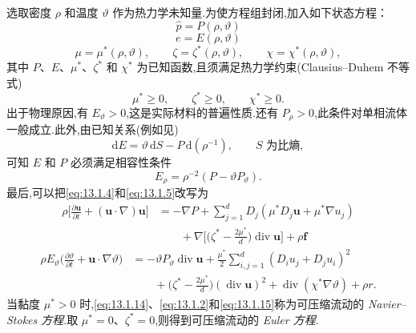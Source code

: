 选取密度 \(\rho\) 和温度 \(\vartheta\) 作为热力学未知量.为使方程组封闭,加入如下状态方程：
\begin{equation}\label{eq:13.1.8}
  \widehat p=P(\rho,\vartheta)
\end{equation}
\begin{equation}\label{eq:13.1.9}
  e=E(\rho,\vartheta)
\end{equation}
\begin{equation}\label{eq:13.1.10}
  \mu=\mu^*(\rho,\vartheta),\qquad
  \zeta=\zeta^*(\rho,\vartheta),\qquad
  \chi=\chi^*(\rho,\vartheta),
\end{equation}
其中 \(P\)、\(E\)、\(\mu^*\)、\(\zeta^*\) 和 \(\chi^*\) 为已知函数,且须满足热力学约束(Clausius--Duhem 不等式)
\begin{equation}\label{eq:13.1.11}
  \mu^*\ge0,\qquad\zeta^*\ge0,\qquad\chi^*\ge0.
\end{equation}
出于物理原因,有 \(E_\vartheta>0\),这是实际材料的普遍性质.还有 \(P_\rho>0\),此条件对单相流体一般成立.此外,由已知关系(例如见)
\begin{equation}\label{eq:13.1.12}
  \mathrm dE=\vartheta\,\mathrm dS-P\,\mathrm d(\rho^{-1}),
  \qquad S\text{ 为比熵},
\end{equation}
可知 \(E\) 和 \(P\) 必须满足相容性条件
\begin{equation}\label{eq:13.1.13}
  E_\rho=\rho^{-2}(P-\vartheta P_\vartheta).
\end{equation}
最后,可以把\eqref{eq:13.1.4}和\eqref{eq:13.1.5}改写为
\begin{equation}\label{eq:13.1.14}
  \begin{aligned}
    \rho\biggl[\frac{\partial\boldsymbol{u}}{\partial t}
       +(\boldsymbol{u}\cdot\nabla)\boldsymbol{u}\biggr]
      &=-\nabla P+\sum_{j=1}^dD_j(\mu^* D_j\boldsymbol{u}+\mu^*\nabla u_j)\\
      &\qquad+\nabla\biggl[\biggl(\zeta^*-\frac{2\mu^*}{d}\biggr)
            \operatorname{div}\boldsymbol{u}\biggr]+\rho\boldsymbol{f}
  \end{aligned}
\end{equation}
\begin{equation}\label{eq:13.1.15}
  \begin{aligned}
    \rho E_\vartheta\biggl(\frac{\partial\vartheta}{\partial t}
       +\boldsymbol{u}\cdot\nabla\vartheta\biggr)
      &=-\vartheta P_\vartheta\operatorname{div}\boldsymbol{u}
           +\frac{\mu^*}{2}\sum_{i,j=1}^d(D_i u_j+D_j u_i)^2\\
      &\qquad+\biggl(\zeta^*-\frac{2\mu^*}{d}\biggr)
            (\operatorname{div}\boldsymbol{u})^2+\operatorname{div}(\chi^*\nabla\vartheta)+\rho r.
  \end{aligned}
\end{equation}
当黏度 \(\mu^*>0\) 时,\eqref{eq:13.1.14}、\eqref{eq:13.1.2}和\eqref{eq:13.1.15}称为可压缩流动的 \emph{Navier--Stokes 方程}.取 \(\mu^*=0\)、\(\zeta^*=0\),则得到可压缩流动的 \emph{Euler 方程}.

